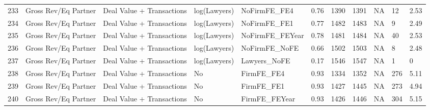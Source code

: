 \documentclass{article}
\begin{document}
\begin{table}[H]
\begin{tabular}{rllllllllll}
  233 & Gross Rev/Eq Partner & Deal Value + Transactions & log(Lawyers) & NoFirmFE\_FE4 & 0.76 & 1390 & 1391 & NA & 12 & 2.53 \\ 
  234 & Gross Rev/Eq Partner & Deal Value + Transactions & log(Lawyers) & NoFirmFE\_FE1 & 0.77 & 1482 & 1483 & NA & 9 & 2.49 \\ 
  235 & Gross Rev/Eq Partner & Deal Value + Transactions & log(Lawyers) & NoFirmFE\_FEYear & 0.78 & 1481 & 1484 & NA & 40 & 2.53 \\ 
  236 & Gross Rev/Eq Partner & Deal Value + Transactions & log(Lawyers) & NoFirmFE\_NoFE & 0.66 & 1502 & 1503 & NA & 8 & 2.48 \\ 
  237 & Gross Rev/Eq Partner & Deal Value + Transactions & log(Lawyers) & Lawyers\_NoFE & 0.17 & 1546 & 1547 & NA & 1 & 0 \\ 
  238 & Gross Rev/Eq Partner & Deal Value + Transactions & No & FirmFE\_FE4 & 0.93 & 1334 & 1352 & NA & 276 & 5.11 \\ 
  239 & Gross Rev/Eq Partner & Deal Value + Transactions & No & FirmFE\_FE1 & 0.93 & 1427 & 1445 & NA & 273 & 4.94 \\ 
  240 & Gross Rev/Eq Partner & Deal Value + Transactions & No & FirmFE\_FEYear & 0.93 & 1426 & 1446 & NA & 304 & 5.15 \\ 
   \hline
\end{tabular}
\end{table}
\end{document}
